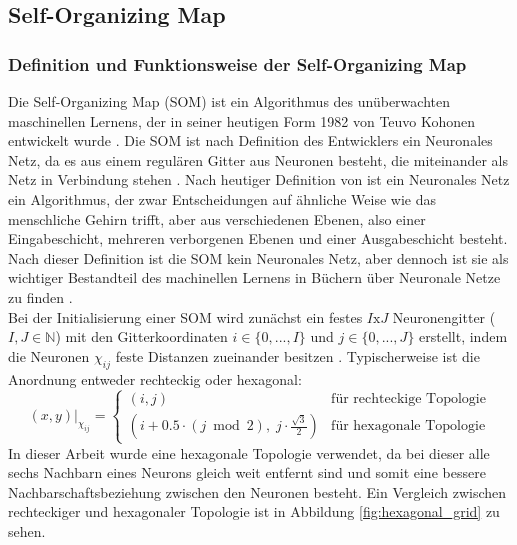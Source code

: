 \subsection{Self-Organizing Map}

\subsubsection{Definition und Funktionsweise der Self-Organizing Map}

Die Self-Organizing Map (SOM) ist ein Algorithmus des unüberwachten maschinellen Lernens, der in seiner heutigen Form 1982 von Teuvo Kohonen entwickelt wurde \parencite{kohonen_self-organizing_2001}.
Die SOM ist nach Definition des Entwicklers ein Neuronales Netz, da es aus einem regulären Gitter aus Neuronen besteht, die miteinander als Netz in Verbindung stehen \parencite{kohonen_self-organizing_2001}. Nach heutiger Definition von \textcite{ibm_data_and_ai_team_what_nodate} ist ein Neuronales Netz ein Algorithmus, der zwar Entscheidungen auf ähnliche Weise wie das menschliche Gehirn trifft, aber aus verschiedenen Ebenen, also einer Eingabeschicht, mehreren verborgenen Ebenen und einer Ausgabeschicht besteht. Nach dieser Definition ist die SOM kein Neuronales Netz, aber dennoch ist sie als wichtiger Bestandteil des machinellen Lernens in Büchern über Neuronale Netze zu finden \parencites{brause_neuronale_1995}{rojas_theorie_1993}{kinnebrock_neuronale_2018}.\\
Bei der Initialisierung einer SOM wird zunächst ein festes $I \text{x} J$ Neuronengitter ($I, J \in \mathbb{N}$) mit den Gitterkoordinaten $i \in \{0, ..., I\}$ und $j \in \{0, ..., J\}$ erstellt, indem die Neuronen $\chi_{ij}$ feste Distanzen zueinander besitzen \parencite{kohonen_self-organizing_2001}. Typischerweise ist die Anordnung entweder rechteckig oder hexagonal:\\

\begin{equation}
    (x,y)|_{\chi_{ij}} = 
    \begin{cases}
        (i, j) & \text{für rechteckige Topologie} \\
        (i + 0.5 \cdot (j \bmod 2),\; j \cdot \frac{\sqrt{3}}{2}) & \text{für hexagonale Topologie}
    \end{cases}
    \label{eq:grid}
\end{equation}
\noindent In dieser Arbeit wurde eine hexagonale Topologie verwendet, da bei dieser alle sechs Nachbarn eines Neurons gleich weit entfernt sind und somit eine bessere Nachbarschaftsbeziehung zwischen den Neuronen besteht. Ein Vergleich zwischen rechteckiger und hexagonaler Topologie ist in Abbildung \ref{fig:hexagonal_grid} zu sehen.\\


